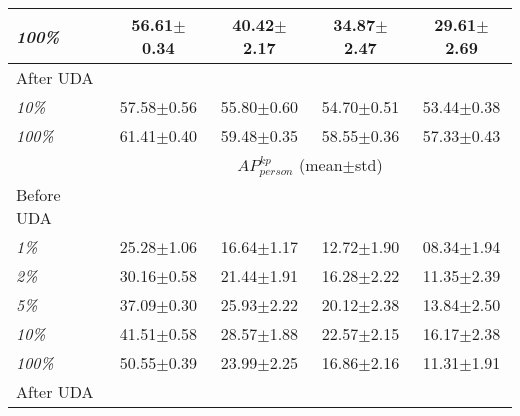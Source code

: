 \begin{table}[bt!]
{\begin{tabular}{l|cccc}
			\emph{100\%}            & 56.61$\pm$0.34                                                                                        & 40.42$\pm$2.17 & 34.87$\pm$2.47 & 29.61$\pm$2.69 \Tstrut  \\\hline
			After UDA               &                                                                                                       &                & \Tstrut                                  \\
			\emph{10\%}             & 57.58$\pm$0.56                                                                                        & 55.80$\pm$0.60 & 54.70$\pm$0.51 & 53.44$\pm$0.38 \Tstrut  \\
			\emph{100\%}            & 61.41$\pm$0.40                                                                                        & 59.48$\pm$0.35 & 58.55$\pm$0.36 & 57.33$\pm$0.43 \Tstrut  \\
			\hline
			                        & \multicolumn{4}{c}{$\mathit{AP_{person}^{kp}}$ (mean$\pm$std)} \Tstrut \Bstrut                                                                           \\
			\hline
			Before UDA              &                                                                                                       &                & \Tstrut                                  \\
			\emph{1\%}              & 25.28$\pm$1.06                                                                                        & 16.64$\pm$1.17 & 12.72$\pm$1.90 & 08.34$\pm$1.94 \Tstrut  \\
			\emph{2\%}              & 30.16$\pm$0.58                                                                                        & 21.44$\pm$1.91 & 16.28$\pm$2.22 & 11.35$\pm$2.39 \Tstrut  \\
			\emph{5\%}              & 37.09$\pm$0.30                                                                                        & 25.93$\pm$2.22 & 20.12$\pm$2.38 & 13.84$\pm$2.50 \Tstrut  \\
			\emph{10\%}             & 41.51$\pm$0.58                                                                                        & 28.57$\pm$1.88 & 22.57$\pm$2.15 & 16.17$\pm$2.38 \Tstrut  \\
			\emph{100\%}            & 50.55$\pm$0.39                                                                                        & 23.99$\pm$2.25 & 16.86$\pm$2.16 & 11.31$\pm$1.91 \Tstrut  \\\hline
			After UDA               &                                                                                                       &                & \Tstrut                                  \\

\end{tabular}}
\end{table}
